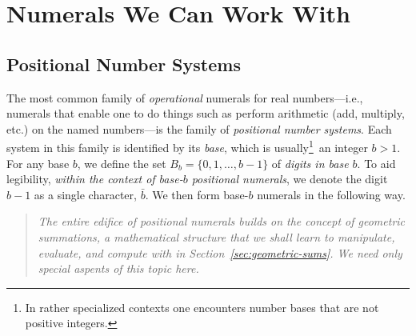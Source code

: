 \section{Numerals We Can Work With}
\label{sec:Numerals}


\subsection{Positional Number Systems}
\label{sec:positional-numbers}

The most common family of {\em operational}
 numerals for real numbers---i.e.,
numerals that enable one to do things such as perform arithmetic (add,
multiply, etc.) on the named numbers---is the family of {\it
  positional number systems}.  Each system in this family is
identified by its {\em base}, 
which is usually\footnote{In rather specialized contexts one
  encounters number bases that are not positive integers.}~an
integer $b >1$.
For any base $b$, we define the set $B_b = \{ 0, 1, \ldots, b-1\}$ of
{\it digits in base $b$}.
%
To aid legibility, {\em within the context of base-$b$ positional
  numerals}, we denote the digit $b-1$ as a single character, $\bar{b}$.
%
We then form base-$b$ numerals in the following way.
\begin{quote}
{\em The entire edifice of positional numerals builds on the concept
  of {\em geometric summations}, a mathematical structure that we
  shall learn to manipulate, evaluate, and compute with in
  Section~\ref{sec:geometric-sums}.  We need only special aspents of
  this topic here.
}
\end{quote}

